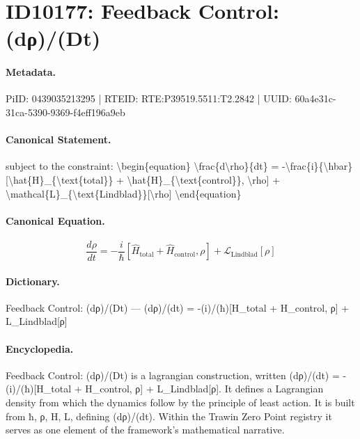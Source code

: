 \section*{ID10177: Feedback Control: (dρ)/(Dt)}
\paragraph{Metadata.}
PiID: 0439035213295 | RTEID: RTE:P39519.5511:T2.2842 | UUID: 60a4e31c-31ca-5390-9369-f4eff196a9eb

\paragraph{Canonical Statement.}
subject to the constraint: \textbackslash{}begin\{equation\} \textbackslash{}frac\{d\textbackslash{}rho\}\{dt\} = -\textbackslash{}frac\{i\}\{\textbackslash{}hbar\}[\textbackslash{}hat\{H\}\_\{\textbackslash{}text\{total\}\} + \textbackslash{}hat\{H\}\_\{\textbackslash{}text\{control\}\}, \textbackslash{}rho] + \textbackslash{}mathcal\{L\}\_\{\textbackslash{}text\{Lindblad\}\}[\textbackslash{}rho] \textbackslash{}end\{equation\}

\paragraph{Canonical Equation.}
\[
\frac{d\rho}{dt} = -\frac{i}{\hbar}[\hat{H}_{\text{total}} + \hat{H}_{\text{control}}, \rho] + \mathcal{L}_{\text{Lindblad}}[\rho]
\]

\paragraph{Dictionary.}
Feedback Control: (dρ)/(Dt) — (dρ)/(dt) = -(i)/(ħ)[H\_total + H\_control, ρ] + L\_Lindblad[ρ]

\paragraph{Encyclopedia.}
Feedback Control: (dρ)/(Dt) is a lagrangian construction, written (dρ)/(dt) = -(i)/(ħ)[H\_total + H\_control, ρ] + L\_Lindblad[ρ]. It defines a Lagrangian density from which the dynamics follow by the principle of least action. It is built from ħ, ρ, H, L, defining (dρ)/(dt). Within the Trawin Zero Point registry it serves as one element of the framework's mathematical narrative.
